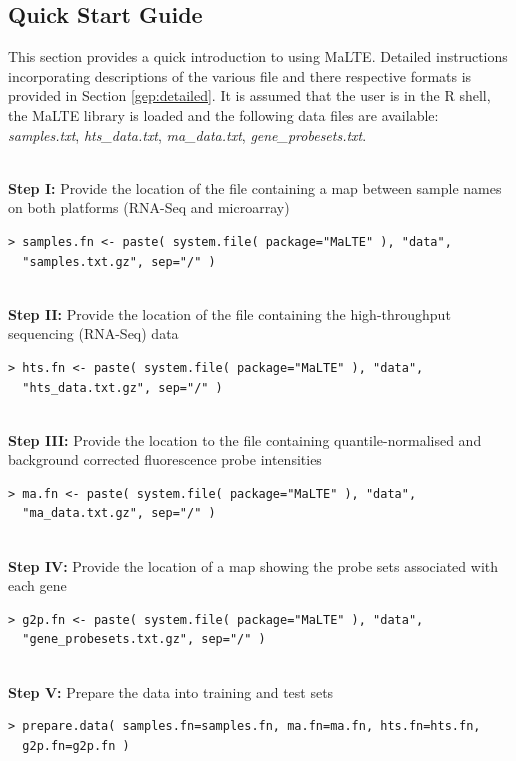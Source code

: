 \documentclass[a4paper,12pt]{article}
\begin{document}
\subsection{Quick Start Guide}
\label{gep:quick}
This section provides a quick introduction to using \textsf{MaLTE}. Detailed instructions incorporating descriptions of the various file and there respective formats is provided in Section \ref{gep:detailed}. It is assumed that the user is in the \textsf{R} shell, the \textsf{MaLTE} library is loaded and the following data files are available: \textit{samples.txt}, \textit{hts\_data.txt}, \textit{ma\_data.txt}, \textit{gene\_probesets.txt}.

\noindent\\
\textbf{Step I:} Provide the location of the file containing a map between sample names on both platforms (RNA-Seq and microarray)
\begin{verbatim}
> samples.fn <- paste( system.file( package="MaLTE" ), "data", 
  "samples.txt.gz", sep="/" )
\end{verbatim}

\noindent\\
\textbf{Step II:} Provide the location of the file containing the high-throughput sequencing (RNA-Seq) data
\begin{verbatim}
> hts.fn <- paste( system.file( package="MaLTE" ), "data", 
  "hts_data.txt.gz", sep="/" )
\end{verbatim}

\noindent\\
\textbf{Step III:} Provide the location to the file containing quantile-normalised and background corrected fluorescence probe intensities
\begin{verbatim}
> ma.fn <- paste( system.file( package="MaLTE" ), "data", 
  "ma_data.txt.gz", sep="/" )
\end{verbatim}

\noindent\\
\textbf{Step IV:} Provide the location of a map showing the probe sets associated with each gene
\begin{verbatim}
> g2p.fn <- paste( system.file( package="MaLTE" ), "data", 
  "gene_probesets.txt.gz", sep="/" )
\end{verbatim}

\noindent\\
\textbf{Step V:} Prepare the data into training and test sets
\begin{verbatim}
> prepare.data( samples.fn=samples.fn, ma.fn=ma.fn, hts.fn=hts.fn, 
  g2p.fn=g2p.fn )
\end{verbatim}
\end{document}
